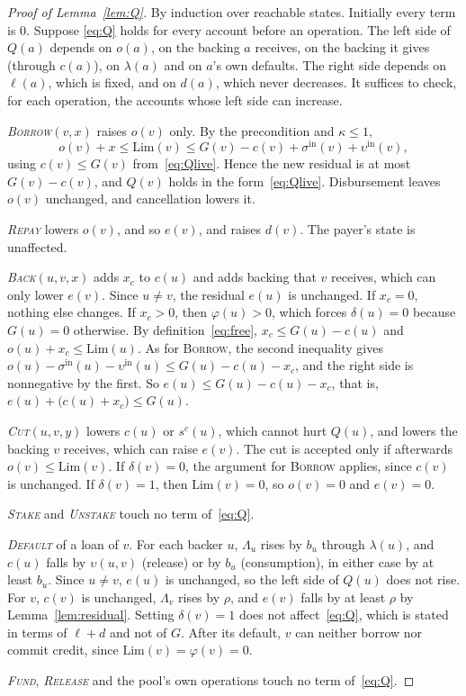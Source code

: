 \documentclass[acmsmall,nonacm,screen]{acmart}
\theoremstyle{acmdefinition}%
\newcommand{\Lim}{\mathrm{Lim}}
\newcommand{\sigin}{\sigma^{\mathrm{in}}}
\newcommand{\upsin}{\upsilon^{\mathrm{in}}}
\newcommand{\Op}[1]{\textsc{#1}}
\begin{document}
\begin{proof}[Proof of Lemma~\ref{lem:Q}]
By induction over reachable states. Initially every term is $0$. Suppose \eqref{eq:Q} holds for
every account before an operation. The left side of $Q(a)$ depends on $o(a)$, on the backing $a$
receives, on the backing it gives (through $c(a)$), on $\lambda(a)$ and on $a$'s own defaults. The
right side depends on $\ell(a)$, which is fixed, and on $d(a)$, which never decreases. It suffices
to check, for each operation, the accounts whose left side can increase.

\emph{\Op{Borrow}$(v,x)$} raises $o(v)$ only. By the precondition and $\kappa\le1$,
\[
  o(v)+x\le\Lim(v)\le G(v)-c(v)+\sigin(v)+\upsin(v),
\]
using $c(v)\le G(v)$ from~\eqref{eq:Qlive}. Hence the new residual is at most $G(v)-c(v)$, and
$Q(v)$ holds in the form~\eqref{eq:Qlive}. Disbursement leaves $o(v)$ unchanged, and
cancellation lowers it.

\emph{\Op{Repay}} lowers $o(v)$, and so $e(v)$, and raises $d(v)$. The payer's state is unaffected.

\emph{\Op{Back}$(u,v,x)$} adds $x_c$ to $c(u)$ and adds backing that $v$ receives, which can only
lower $e(v)$. Since $u\ne v$, the residual $e(u)$ is unchanged. If $x_c=0$, nothing else changes.
If $x_c>0$, then $\varphi(u)>0$, which forces $\delta(u)=0$ because $G(u)=0$ otherwise. By
definition~\eqref{eq:free}, $x_c\le G(u)-c(u)$ and $o(u)+x_c\le\Lim(u)$. As for \Op{Borrow}, the
second inequality gives $o(u)-\sigin(u)-\upsin(u)\le G(u)-c(u)-x_c$, and the right side is
nonnegative by the first. So $e(u)\le G(u)-c(u)-x_c$, that is,
$e(u)+\bigl(c(u)+x_c\bigr)\le G(u)$.

\emph{\Op{Cut}$(u,v,y)$} lowers $c(u)$ or $s^c(u)$, which cannot hurt $Q(u)$, and lowers the
backing $v$ receives, which can raise $e(v)$. The cut is accepted only if afterwards
$o(v)\le\Lim(v)$. If $\delta(v)=0$, the argument for \Op{Borrow} applies, since $c(v)$ is unchanged.
If $\delta(v)=1$, then $\Lim(v)=0$, so $o(v)=0$ and $e(v)=0$.

\emph{\Op{Stake}} and \emph{\Op{Unstake}} touch no term of~\eqref{eq:Q}.

\emph{\Op{Default}} of a loan of $v$. For each backer $u$, $\Lambda_u$ rises by $b_u$ through
$\lambda(u)$, and $c(u)$ falls by $\upsilon(u,v)$ (release) or by $b_u$ (consumption), in either
case by at least $b_u$. Since $u\ne v$, $e(u)$ is unchanged, so the left side of $Q(u)$ does not
rise. For $v$, $c(v)$ is unchanged, $\Lambda_v$ rises by $\rho$, and $e(v)$ falls by at least
$\rho$ by Lemma~\ref{lem:residual}. Setting $\delta(v)=1$ does not affect~\eqref{eq:Q}, which is
stated in terms of $\ell+d$ and not of $G$. After its default, $v$ can neither borrow nor commit
credit, since $\Lim(v)=\varphi(v)=0$.

\emph{\Op{Fund}}, \emph{\Op{Release}} and the pool's own operations touch no term
of~\eqref{eq:Q}.
\end{proof}
\end{document}
